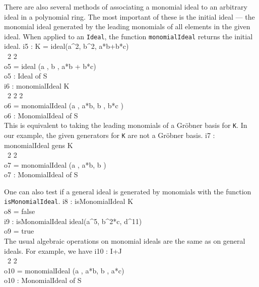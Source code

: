 There are also several methods of associating a monomial
ideal to an arbitrary ideal in a polynomial ring.  The most important
of these is the initial ideal --- the monomial ideal generated by the
leading monomials of all elements in the given ideal.  When applied to
an {\tt Ideal}, the function {\tt monomialIdeal} returns the initial
ideal.
\beginOutput
i5 : K = ideal(a^2, b^2, a*b+b*c)\\
\emptyLine
\             2   2\\
o5 = ideal (a , b , a*b + b*c)\\
\emptyLine
o5 : Ideal of S\\
\endOutput
\beginOutput
i6 : monomialIdeal K\\
\emptyLine
\                     2        2     2\\
o6 = monomialIdeal (a , a*b, b , b*c )\\
\emptyLine
o6 : MonomialIdeal of S\\
\endOutput
This is equivalent to taking the leading monomials of a Gr\"{o}bner
basis for {\tt K}.  In our example, the given
generators for {\tt K} are not a Gr\"{o}bner basis.
\beginOutput
i7 : monomialIdeal gens K\\
\emptyLine
\                     2        2\\
o7 = monomialIdeal (a , a*b, b )\\
\emptyLine
o7 : MonomialIdeal of S\\
\endOutput

One can also test if a general ideal is generated by monomials with
the function {\tt isMonomialIdeal}.
\beginOutput
i8 : isMonomialIdeal K\\
\emptyLine
o8 = false\\
\endOutput
\beginOutput
i9 : isMonomialIdeal ideal(a^5, b^2*c, d^11)\\
\emptyLine
o9 = true\\
\endOutput
The usual algebraic operations on monomial ideals are the same as on
general ideals. For example, we have
\beginOutput
i10 : I+J\\
\emptyLine
\                      2        2\\
o10 = monomialIdeal (a , a*b, b , a*c)\\
\emptyLine
o10 : MonomialIdeal of S\\
\endOutput


